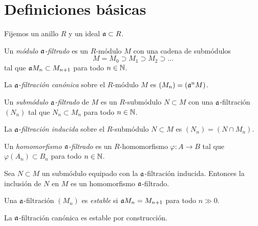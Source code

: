 \section{Definiciones básicas}

\begin{preliminaries}
Fijemos un anillo $R$ y un ideal $\mathfrak a \subset R$.
\end{preliminaries}

\begin{definition}
Un \textit{módulo $\mathfrak a$-filtrado} es un $R$-módulo $M$ con una cadena de submódulos
$$M = M_0 \supset M_1 \supset M_2 \supset \dots$$
tal que $\mathfrak a M_n \subset M_{n+1}$ para todo $n \in \mathbb N$.
\end{definition}

\begin{example}
La $\mathfrak a$-\textit{filtración canónica} sobre el $R$-módulo $M$ es $(M_n) = (\mathfrak a^n M)$.
\end{example}

\begin{definition}
Un \textit{submódulo $\mathfrak a$-filtrado} de $M$ es un $R$-submódulo $N \subset M$ con una $\mathfrak a$-filtración $(N_n)$ tal que $N_n \subset M_n$ para todo $n \in \mathbb N$.
\end{definition}

\begin{example}
La $\mathfrak a$-\textit{filtración inducida} sobre el $R$-submódulo $N \subset M$ es $(N_n) = (N \cap M_n)$.
\end{example}

\begin{definition}
Un \textit{homomorfismo $\mathfrak a$-filtrado} es un $R$-homomorfismo $\varphi : A \to B$ tal que $\varphi(A_n) \subset B_n$ para todo $n \in \mathbb N$.
\end{definition}

\begin{example}
Sea $N \subset M$ un submódulo equipado con la $\mathfrak a$-filtración inducida. Entonces la inclusión de $N$ en $M$ es un homomorfismo $\mathfrak a$-filtrado.
\end{example}

\begin{definition}
Una $\mathfrak a$-filtración $(M_n)$ es \textit{estable} si $\mathfrak a M_n = M_{n+1}$ para todo $n \gg 0$.
\end{definition}

\begin{example}
La $\mathfrak a$-filtración canónica es estable por construcción.
\end{example}

